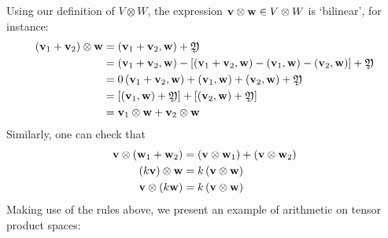 \noindent Using our definition of $V \otimes W$, the expression ${\bf v} \otimes {\bf w} \in V \otimes W$ is `bilinear', for instance:
\begin{equation} \label{eq:tensorrule1}
\begin{aligned}
\left( {{\bf v}_1 + {\bf v}_2}\right)  \otimes  \mathbf{w} &= \left( {{\bf v}_1 + {\bf v}_2,\mathbf{w}}\right)  + \mathfrak{Y} \\
&= \left( {{\bf v}_1 + {\bf v}_2,\mathbf{w}}\right)  - \left\lbrack  {\left( {{\bf v}_1 + {\bf v}_2,\mathbf{w}}\right)  - \left( {{\bf v}_1,\mathbf{w}}\right)  - \left( {{\bf v}_2,\mathbf{w}}\right) }\right\rbrack   + \mathfrak{Y}
\\
&= 0\left( {{\bf v}_1 + {\bf v}_2,\mathbf{w}}\right)  + \left( {{\bf v}_1,\mathbf{w}}\right)  + \left( {{\bf v}_2,\mathbf{w}}\right)  + \mathfrak{Y}
\\
&= \left\lbrack  {\left( {{\bf v}_1,\mathbf{w}}\right)  + \mathfrak{Y}}\right\rbrack   + \left\lbrack  {\left( {{\bf v}_2,\mathbf{w}}\right)  + \mathfrak{Y}}\right\rbrack
\\
&= {\bf v}_1 \otimes  {\bf w} + {\bf v}_2 \otimes  {\bf w}
\end{aligned}
\end{equation}
Similarly, one can check that
\begin{equation} \label{eq:tensorrule2}
\begin{aligned}
\mathbf{v} \otimes  \left( {{\bf w}_1 + {\bf w}_2}\right)  &= \left( {\mathbf{v} \otimes  {\bf w}_1}\right)  + \left( {\mathbf{v} \otimes  {\bf w}_2}\right)
\\
\left( {k\mathbf{v}}\right)  \otimes  \mathbf{w} &= k\left( {\mathbf{v} \otimes  \mathbf{w}}\right)
\\
\mathbf{v} \otimes  \left( {k\mathbf{w}}\right)  &= k\left( {\mathbf{v} \otimes  \mathbf{w}}\right)
\end{aligned}
\end{equation}
Making use of the rules above, we present an example of arithmetic on tensor product spaces:
